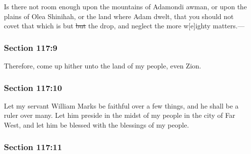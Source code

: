 		\begin{framed}
		\scriptsize
			\begin{compactdesc}
				\item[JSP] Is there not room enough upon the mountains of Adamondi awman, or upon the plains of Olea Shinihah, or the land where Adam dwelt, that you should not covet that which is but \sout{but} the drop, and neglect the more w[e]ighty matters.---
			\end{compactdesc}
		\end{framed}

	\subsubsection{Section 117:9} %
		\label{DC117-9}

		Therefore, come up hither unto the land of my people, even Zion.


	\subsubsection{Section 117:10} %
		\label{DC117-10}

		Let my servant William Marks be faithful over a few things, and he shall be a ruler over many.  Let him preside in the midst of my people in the city of Far West, and let him be blessed with the blessings of my people.


	\subsubsection{Section 117:11} %
		\label{DC117-11}

